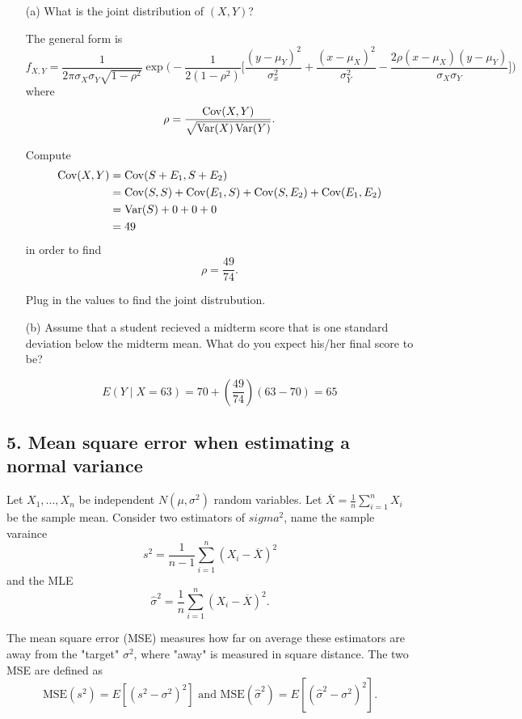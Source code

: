 \documentclass{tufte-book}
\begin{document}
\begin{enumerate}
\item[(a)] What is the joint distribution of $(X,Y)$?

The general form is 
\[ f_{X,Y} = \frac{1}{2\pi\sigma_X\sigma_Y\sqrt{1-\rho^2}} \exp\big(-\frac{1}{2(1-\rho^2)}\big[ \frac{(y-\mu_Y)^2}{\sigma_x^2}+\frac{(x-\mu_X)^2}{\sigma_Y^2} - \frac{2\rho(x-\mu_X)(y-\mu_Y)}{\sigma_X\sigma_Y} \big]\big) \]
where
\[ \rho=\frac{\operatorname{Cov}(X,Y)}{\sqrt{\operatorname{Var}(X)\operatorname{Var}(Y)}}. \]

Compute
\begin{align*}
\operatorname{Cov}(X,Y) &= \operatorname{Cov}(S+E_1,S+E_2)\\
&=\operatorname{Cov}(S,S) + \operatorname{Cov}(E_1,S) + \operatorname{Cov}(S,E_2) + \operatorname{Cov}(E_1,E_2)\\
&= \operatorname{Var}(S) + 0 + 0 + 0\\
&= 49
\end{align*}
in order to find
\[ \rho=\frac{49}{74}. \]

Plug in the values to find the joint distrubution.

\item[(b)]Assume that a student recieved a midterm score that is one standard deviation below the midterm mean.  What do you expect his/her final score to be?

\[ E(Y \mid X=63) = 70 + (\frac{49}{74})(63-70) = 65 \]

\end{enumerate}

\subsection{5. Mean square error when estimating a normal variance}
Let $X_1,...,X_n$ be independent $N(\mu,\sigma^2)$ random variables.  Let $\overline{X}=\frac{1}{n}\sum_{i=1}^nX_i$ be the sample mean.  Consider two estimators of $sigma^2$, name the sample varaince
\[ s^2 = \frac{1}{n-1}\sum_{i=1}^n(X_i-\overline{X})^2 \]
and the MLE
\[ \hat{\sigma}^2 = \frac{1}{n}\sum_{i=1}^n(X_i-\overline{X})^2.\]

The mean square error (MSE) measures how far on average these estimators are away from the "target" $\sigma^2$, where "away" is measured in square distance.  The two MSE are defined as
\[ \text{MSE}(s^2) = E[(s^2-\sigma^2)^2] \text{ and MSE}(\hat{\sigma}^2)= E[(\hat{\sigma}^2 - \sigma^2)^2].\]
\end{document}
